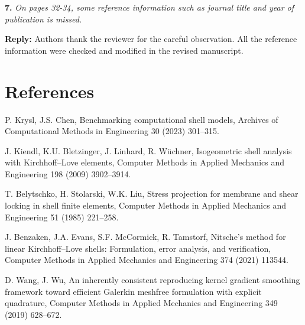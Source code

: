 \documentclass{article}
\begin{document}
\textbf{7.} \textit{On pages 32-34, some reference information such as journal title and year of publication is missed.}

\textbf{Reply:} Authors thank the reviewer for the careful observation. All the reference information were checked and modified in the revised manuscript.

\section*{References}
\begin{enumerate}[{[1]}]
    \item P. Krysl, J.S. Chen, Benchmarking computational shell models, Archives of Computational Methods in Engineering 30 (2023) 301–315. 
    \item J. Kiendl, K.U. Bletzinger, J. Linhard, R. Wüchner, Isogeometric shell analysis with Kirchhoff–Love elements, Computer Methods in Applied Mechanics and Engineering 198 (2009) 3902–3914. 
    \item T. Belytschko, H. Stolarski, W.K. Liu, Stress projection for membrane and shear locking in shell finite elements, Computer Methods in Applied Mechanics and Engineering 51 (1985) 221–258. 
    \item J. Benzaken, J.A. Evans, S.F. McCormick, R. Tamstorf, Nitsche’s method for linear Kirchhoff–Love shells: Formulation, error analysis, and verification, Computer Methods in Applied Mechanics and Engineering 374 (2021) 113544. 
    \item D. Wang, J. Wu, An inherently consistent reproducing kernel gradient smoothing framework toward efficient Galerkin meshfree formulation with explicit quadrature, Computer Methods in Applied Mechanics and Engineering 349 (2019) 628–672. 
\end{enumerate}
\end{document}
